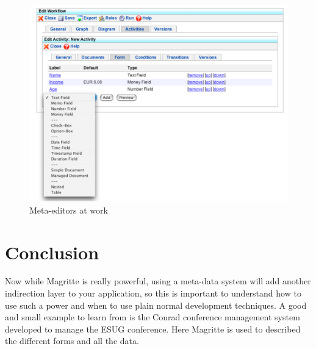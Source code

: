 \documentclass[a4paper,10pt,twoside]{book}
\begin{document}
\begin{figure}[!h]
	\begin{center}
\includegraphics[width=\linewidth]{aare}
\caption{Meta-editors at work\label{aare}}
 \end{center}
\end{figure}


\section{Conclusion}

Now while Magritte is really powerful, using a meta-data system will add another indirection layer to your application, so this is important to understand how to use such a power and when to use plain normal development techniques. A good and small example to learn from is the Conrad conference 
management system developed to manage the ESUG conference. Here Magritte is used to described the different forms and all the data. 


\ifx\wholebook\relax\else
    
\end{document}
